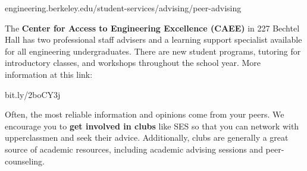 {\selectfont engineering.berkeley.edu/student-services/advising/peer-advising}

The \textbf{Center for Access to Engineering Excellence (CAEE)} in 227 Bechtel Hall has two professional staff advisers and a learning support specialist available for all engineering undergraduates. There are new student programs, tutoring for introductory classes, and workshops throughout the school year. More information at this link:

{\selectfont bit.ly/2boCY3j}

Often, the most reliable information and opinions come from your peers. We encourage you to \textbf{get involved in clubs} like SES so that you can network with upperclassmen and seek their advice. Additionally, clubs are generally a great source of academic resources, including academic advising sessions and peer-counseling.

